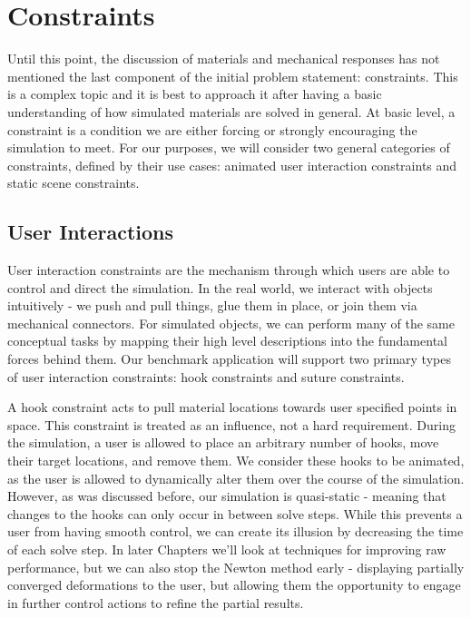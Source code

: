   \section{Constraints}

  Until this point, the discussion of materials and mechanical
  responses has not mentioned the last component of the initial
  problem statement: constraints. This is a complex
  topic and it is best to approach it after having a basic
  understanding of how simulated materials are solved in general. At
  basic level, a constraint is a condition we are either forcing or
  strongly encouraging the simulation to meet. For our purposes, we
  will consider two general categories of constraints, defined by
  their use cases: animated user interaction constraints and static
  scene constraints. 

  \subsection{User Interactions}
  
  User interaction constraints are the mechanism through which users
  are able to control and direct the simulation. In the real world, we
  interact with objects intuitively - we push and pull things, glue
  them in place, or join them via mechanical connectors. For simulated
  objects, we can perform many of the same conceptual tasks by mapping
  their high level descriptions into the fundamental forces behind
  them. Our benchmark application will support two primary types of user
  interaction constraints: hook constraints and suture constraints.  

  A hook constraint acts to pull material locations towards user
  specified points in space. This constraint is treated as an
  influence, not a hard requirement. During the simulation, a user is allowed
  to place an arbitrary number of hooks, move their target locations,
  and remove them. We consider these hooks to be animated, as the user
  is allowed to dynamically alter them over the course of the
  simulation. However, as was discussed before, our simulation is
  quasi-static - meaning that changes to the hooks can only occur
  in between solve steps. While this prevents a user from having
  smooth control, we can create its illusion by decreasing the time of
  each solve step. In later Chapters we'll look at techniques for
  improving raw performance, but we can also stop the Newton method
  early - displaying partially converged deformations to the user, but
  allowing them the opportunity to engage in further control actions
  to refine the partial results.

